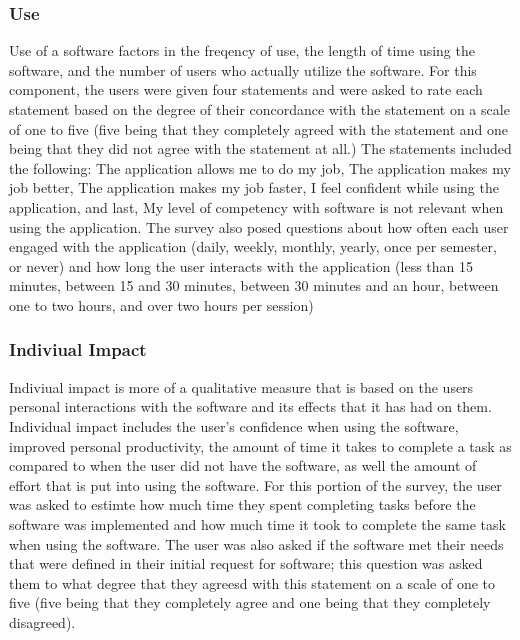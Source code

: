 \subsubsection{Use}
Use of a software factors in the freqency of use, the length of time using the software, and the number of users who actually utilize the software. For this component, the users were given four statements and were asked to rate each statement based on the degree of their concordance with the statement on a scale of one to five (five being that they completely agreed with the statement and one being that they did not agree with the statement at all.) The statements included the following: The application allows me to do my job, The application makes my job better, The application makes my job faster, I feel confident while using the application,  and last, My level of competency with software is not relevant when using the application. The survey also posed questions about how often each user engaged with the application (daily, weekly, monthly, yearly, once per semester, or never)  and how long the user interacts with the application (less than 15 minutes, between 15 and 30 minutes, between 30 minutes and an hour, between one to two hours, and over two hours per session)

\subsubsection{Indiviual Impact}
Indiviual impact is more of a qualitative measure that is based on the users personal interactions with the software and its effects that it has had on them. Individual impact includes the user's confidence when using the software, improved personal productivity, the amount of time it takes to complete a task as compared to when the user did not have the software, as well the amount of effort that is put into using the software. For this portion of the survey, the user was asked to estimte how much time they spent completing tasks before the software was implemented and how much time it took to complete the same task when using the software. The user was also asked if the software met their needs that were defined in their initial request for software; this question was asked them to what degree that they agreesd with this statement on a scale of one to five (five being that they completely agree and one being that they completely disagreed).

